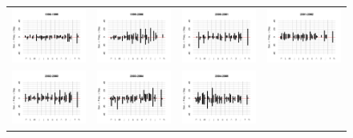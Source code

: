 \documentclass[letter,12pt]{article}
\begin{document}
\begin{figure}
\begin{center}
\begin{tabular}{cccc}
    \includegraphics[width=.22\columnwidth]{../graphs/urgenciasHistog1998.pdf} &
    \includegraphics[width=.22\columnwidth]{../graphs/urgenciasHistog1999.pdf} &
    \includegraphics[width=.22\columnwidth]{../graphs/urgenciasHistog2000.pdf} &
    \includegraphics[width=.22\columnwidth]{../graphs/urgenciasHistog2001.pdf} \\
    \includegraphics[width=.22\columnwidth]{../graphs/urgenciasHistog2002.pdf} &
    \includegraphics[width=.22\columnwidth]{../graphs/urgenciasHistog2003.pdf} &
    \includegraphics[width=.22\columnwidth]{../graphs/urgenciasHistog2004.pdf} &

\end{tabular}
\end{center}
\end{figure}
\end{document}
